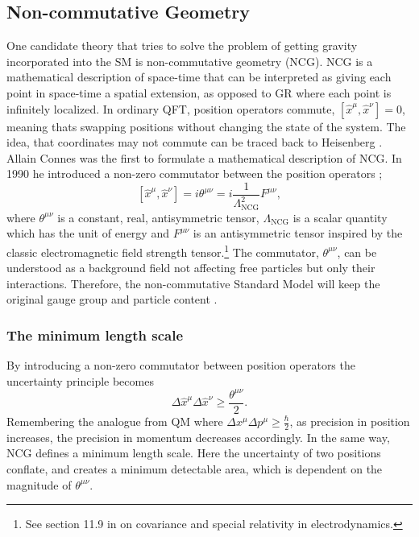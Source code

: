 \subsection{Non-commutative Geometry}
One candidate theory that tries to solve the problem of getting gravity incorporated into the SM is non-commutative geometry (NCG). NCG is a mathematical description of space-time that can be interpreted as giving each point in space-time a spatial extension, as opposed to GR where each point is infinitely localized. In ordinary QFT, position operators commute, $[ \hat x^{\mu}, \hat x^{\nu}] = 0$, meaning thats swapping positions without changing the state of the system. The idea, that coordinates may not commute can be traced back to Heisenberg \cite{snyder1947qst}. Allain Connes \cite{connes1991pma} was the first to formulate a mathematical description of NCG. In 1990 he introduced a non-zero commutator between the position operators \cite{rosendahl2008};
\begin{equation} \label{eq:ncgtheta}
	[ \hat x^{\mu}, \hat x^{\nu}] = i \theta^{\mu \nu} = i \frac{1}{\Lambda_{\textrm{NCG}}^2} F^{\mu\nu},
\end{equation}
where $\theta^{\mu \nu}$ is a constant, real, antisymmetric tensor, $\Lambda_{\textrm{NCG}}$ is a scalar quantity which has the unit of energy and $F^{\mu\nu}$ is an antisymmetric tensor inspired by the classic electromagnetic field strength tensor.\footnote{See section 11.9 in \cite{jackson1975cew} on covariance and special relativity in electrodynamics.} The commutator, $\theta^{\mu \nu}$, can be understood as a background field not affecting free particles but only their interactions. Therefore, the non-commutative Standard Model will keep the original gauge group and particle content \cite{rosendahl2008}.

\subsubsection{The minimum length scale}
By introducing a non-zero commutator between position operators the uncertainty principle becomes
\begin{equation}
\Delta \hat x^{\mu} \Delta \hat x^{\nu} \ge \frac{\theta^{\mu \nu}}{2}.
\end{equation}
Remembering the analogue from QM where $\Delta x^{\mu} \Delta p^{\mu} \ge \frac{\hbar}{2}$, as precision in position increases, the precision in momentum decreases accordingly. In the same way, NCG defines a minimum length scale. Here the uncertainty of two positions conflate, and creates a minimum detectable area, which is dependent on the magnitude of $\theta^{\mu \nu}$.

